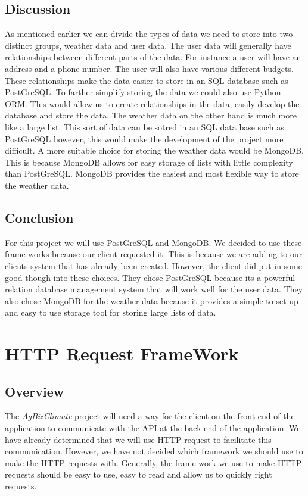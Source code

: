 \documentclass[onecolumn, draftclsnofoot,10pt, compsoc]{article}
\begin{document}
	\subsection{Discussion}
		As mentioned earlier we can divide the types of data we need to store into two distinct groups, weather data and user data. The user data will generally have relationships between different parts of the data. For instance a user will have an address and a phone number. The user will also have various different budgets. These relationships make the data easier to store in an SQL database such as PostGreSQL. To farther simplify storing the data we could also use Python ORM. This would allow us to create relationships in the data, easily develop the database and store the data. The weather data on the other hand is much more like a large list. This sort of data can be sotred in an SQL data base such as PostGreSQL however, this would make the development of the project more difficult. A more suitable choice for storing the weather data would be MongoDB. This is because MongoDB allows for easy storage of lists with little complexity than PostGreSQL. MongoDB provides the easiest and most flexible way to store the weather data.\\
	\subsection{Conclusion}
		For this project we will use PostGreSQL and MongoDB. We decided to use these frame works because our client requested it. This is because we are adding to our clients system that has already been created. However, the client did put in some good though into these choices. They chose PostGreSQL because its a powerful relation database management system that will work well for the user data. They also chose MongoDB for the weather data because it provides a simple to set up and easy to use storage tool for storing large lists of data.\\
	
	
\section{HTTP Request FrameWork}
	\subsection{Overview}
		The \textit{AgBizClimate} project will need a way for the client on the front end of the application to communicate with the API at the back end of the application. We have already determined that we will use HTTP request to facilitate this communication. However, we have not decided which framework we should use to make the HTTP requests with. Generally, the frame work we use to make HTTP requests should be easy to use, easy to read and allow us to quickly right requests.\\
\end{document}
